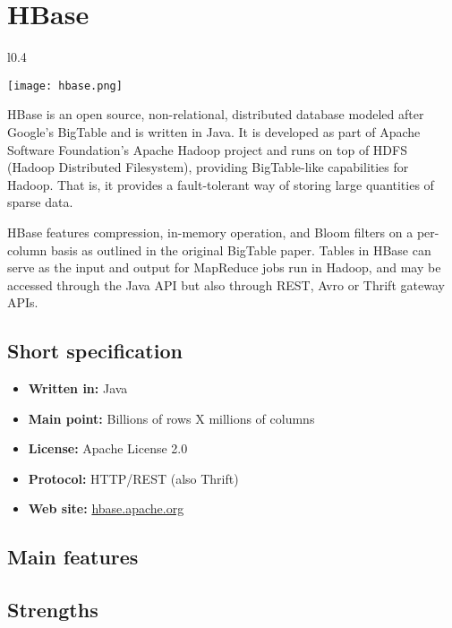 \chapter{HBase}

\begin{wrapfigure}{l}{0.4\textwidth}
  \vspace{-75pt}
  \begin{center}
    \texttt{[image: hbase.png]}
  \end{center}
  \vspace{-30pt}
\end{wrapfigure}
HBase is an open source, non-relational, distributed database modeled after Google's BigTable and is written in Java. It is developed as part of Apache Software Foundation's Apache Hadoop project and runs on top of HDFS (Hadoop Distributed Filesystem), providing BigTable-like capabilities for Hadoop. That is, it provides a fault-tolerant way of storing large quantities of sparse data.

HBase features compression, in-memory operation, and Bloom filters on a per-column basis as outlined in the original BigTable paper. Tables in HBase can serve as the input and output for MapReduce jobs run in Hadoop, and may be accessed through the Java API but also through REST, Avro or Thrift gateway APIs.

\section{Short specification}

\begin{itemize}
  \item \textbf{Written in:} Java
  \item \textbf{Main point:} Billions of rows X millions of columns
  \item \textbf{License:} Apache License 2.0
  \item \textbf{Protocol:} HTTP/REST (also Thrift)
  \item \textbf{Web site:} \href{http://hbase.apache.org/}{hbase.apache.org}
\end{itemize}

\section{Main features}

\section{Strengths}

